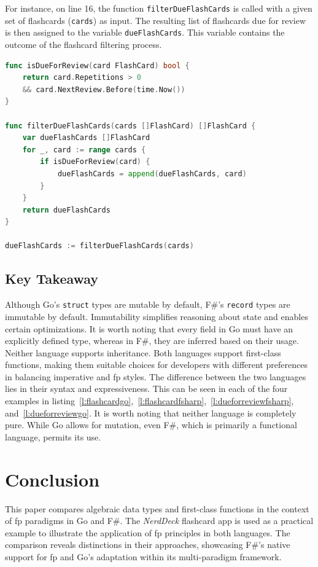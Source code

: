     For instance, on line 16, the function \texttt{filterDueFlashCards} is called with a given set of flashcards (\texttt{cards}) as input. The resulting list of flashcards due for review is then assigned to the variable \texttt{dueFlashCards}. This variable contains the outcome of the flashcard filtering process.

\begin{lstlisting}[language=go, firstnumber=1, caption={First-class function reresentation in Go}, label=l:dueforreviewgo]
func isDueForReview(card FlashCard) bool {
    return card.Repetitions > 0 
    && card.NextReview.Before(time.Now())
}

func filterDueFlashCards(cards []FlashCard) []FlashCard {
    var dueFlashCards []FlashCard
    for _, card := range cards {
        if isDueForReview(card) {
            dueFlashCards = append(dueFlashCards, card)
        }
    }
    return dueFlashCards
}

dueFlashCards := filterDueFlashCards(cards)
\end{lstlisting}
            

    \section{Key Takeaway}\label{sec:keytakeaway}
    Although Go's \texttt{struct} types are mutable by default, F\#'s \texttt{record} types are immutable by default. Immutability simplifies reasoning about state and enables certain optimizations. It is worth noting that every field in Go must have an explicitly defined type, whereas in F\#, they are inferred based on their usage. Neither language supports inheritance. Both languages support first-class functions, making them suitable choices for developers with different preferences in balancing imperative and \ac{fp} styles. The difference between the two languages lies in their syntax and expressiveness. This can be seen in each of the four examples in listing\ \ref{l:flashcardgo},\ \ref{l:flashcardfsharp},\ \ref{l:dueforreviewfsharp}, and\ \ref{l:dueforreviewgo}. It is worth noting that neither language is completely pure. While Go allows for mutation, even F\#, which is primarily a functional language, permits its use.



\chapter{Conclusion}\label{chap:conclusion}
This paper compares algebraic data types and first-class functions in the context of \ac{fp} paradigms in Go and F\#. The \textit{NerdDeck} flashcard \ac{app} is used as a practical example to illustrate the application of \ac{fp} principles in both languages. The comparison reveals distinctions in their approaches, showcasing F\#'s native support for \ac{fp} and Go's adaptation within its multi-paradigm framework.

